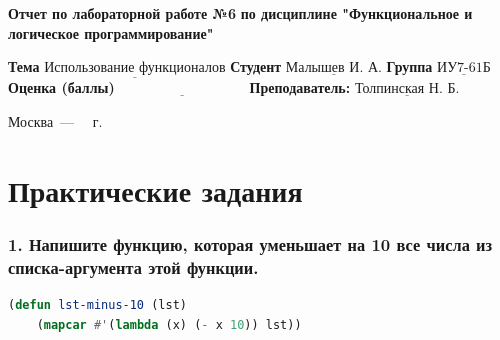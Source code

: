 \documentclass[12pt]{report}
\begin{document}
\begin{titlepage}
	
	\begin{center}
		\noindent\begin{minipage}{1.3\textwidth}\centering
			\Large\textbf{  Отчет по лабораторной работе №6}\newline
			\textbf{по дисциплине \newline "Функциональное и логическое программирование"}\newline\newline
		\end{minipage}
	\end{center}
	
	\noindent\textbf{Тема} $\underline{\text{Использование функционалов}}$\newline\newline
	\noindent\textbf{Студент} $\underline{\text{Малышев И. А.}}$\newline\newline
	\noindent\textbf{Группа} $\underline{\text{ИУ7-61Б}}$\newline\newline
	\noindent\textbf{Оценка (баллы)} $\underline{\text{~~~~~~~~~~~~~~~~~~~~~~~~~~~}}$\newline\newline
	\noindent\textbf{Преподаватель: } $\underline{\text{Толпинская Н. Б.}}$\newline\newline\newline
	
	\begin{center}
		\vfill
		Москва~---~\the\year
		~г.
	\end{center}
\end{titlepage}


\setcounter{page}{2}

\chapter*{Практические задания}

\subsection*{1. Напишите функцию, которая уменьшает на 10 все числа из списка-аргумента этой
	функции.}

\begin{lstlisting}[label=6xd, caption=Решение задания №1, language=lisp]
(defun lst-minus-10 (lst)
	(mapcar #'(lambda (x) (- x 10)) lst))

\end{lstlisting}
\end{document}
